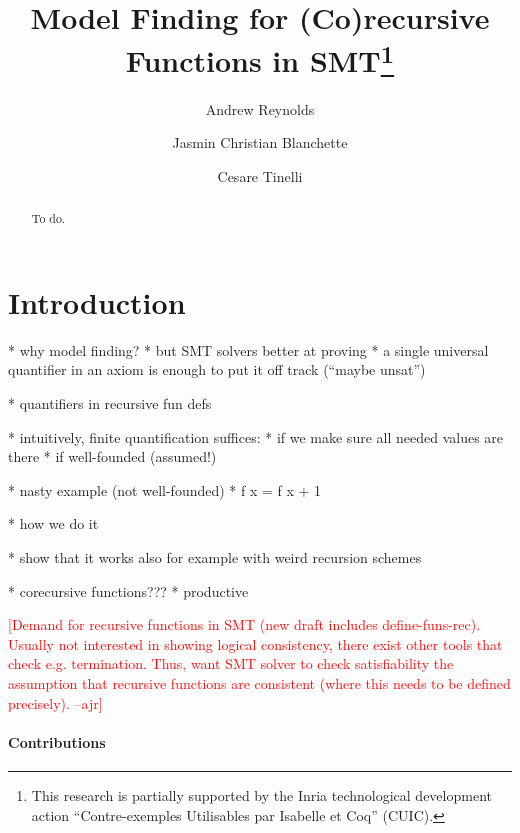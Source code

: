 \documentclass[runningheads,a4paper]{llncs}
\newcommand{\rem}[1]{\textcolor{red}{[#1]}}
\newcommand{\ajr}[1]{\rem{#1 --ajr}}
\begin{document}
\title{Model Finding for (Co)recursive Functions in SMT\thanks{%
This research is partially supported by the Inria technological development
action ``Contre-exemples Utilisables par Isabelle et Coq'' (CUIC).
}
}

\author {Andrew Reynolds \and Jasmin Christian Blanchette \and Cesare Tinelli }

\maketitle

\begin{abstract}
To do.
\end{abstract}

\section{Introduction}
\label{sec:introduction}

  * why model finding?
  * but SMT solvers better at proving
    * a single universal quantifier in an axiom is enough to put it off track
      (``maybe unsat'')

  * quantifiers in recursive fun defs

  * intuitively, finite quantification suffices:
    * if we make sure all needed values are there
    * if well-founded (assumed!)

  * nasty example (not well-founded)
    * f x = f x + 1

  * how we do it

  * show that it works also for example with weird recursion schemes

  * corecursive functions???
    * productive


\ajr{Demand for recursive functions in SMT (new draft includes define-funs-rec).  Usually not interested in showing logical consistency, there exist other tools that check e.g. termination. 
Thus, want SMT solver to check satisfiability the assumption that recursive functions are consistent (where this needs to be defined precisely).
}

\paragraph{Contributions}
\end{document}
